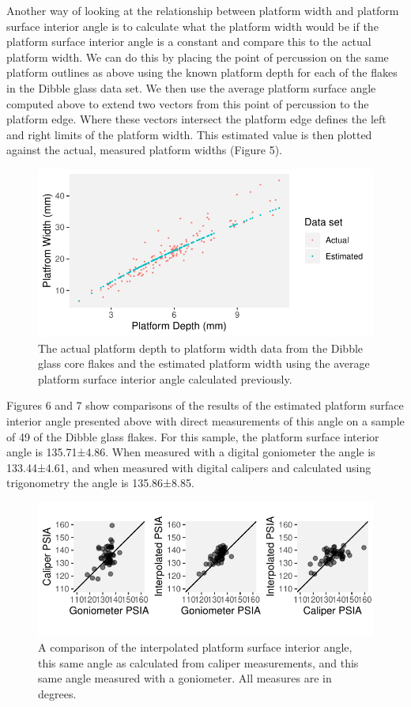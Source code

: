 \documentclass[10pt,letterpaper]{article}
\begin{document}
Another way of looking at the relationship between platform width and
platform surface interior angle is to calculate what the platform width
would be if the platform surface interior angle is a constant and
compare this to the actual platform width. We can do this by placing the
point of percussion on the same platform outlines as above using the
known platform depth for each of the flakes in the Dibble glass data
set. We then use the average platform surface angle computed above to
extend two vectors from this point of percussion to the platform edge.
Where these vectors intersect the platform edge defines the left and
right limits of the platform width. This estimated value is then plotted
against the actual, measured platform widths (Figure 5).

\begin{figure}
\centering
\includegraphics{PSIA_Manuscript_files/figure-latex/fig5-pd_pw_with_estimated_pw-1.pdf}
\caption{The actual platform depth to platform width data from the
Dibble glass core flakes and the estimated platform width using the
average platform surface interior angle calculated previously.}
\end{figure}

Figures 6 and 7 show comparisons of the results of the estimated
platform surface interior angle presented above with direct measurements
of this angle on a sample of 49 of the Dibble glass flakes. For this
sample, the platform surface interior angle is 135.71±4.86. When
measured with a digital goniometer the angle is 133.44±4.61, and when
measured with digital calipers and calculated using trigonometry the
angle is 135.86±8.85.

\begin{figure}
\centering
\includegraphics{PSIA_Manuscript_files/figure-latex/fig6_remeasure_comparisons-1.pdf}
\caption{A comparison of the interpolated platform surface interior
angle, this same angle as calculated from caliper measurements, and this
same angle measured with a goniometer. All measures are in degrees.}
\end{figure}
\end{document}
